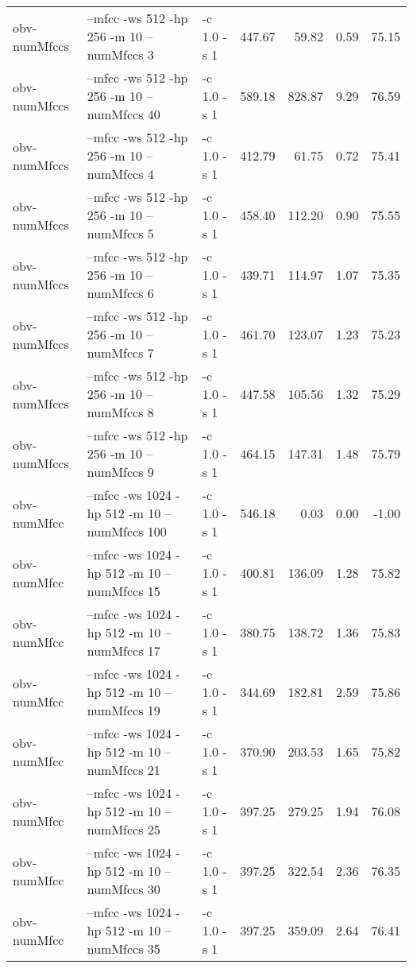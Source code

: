 \documentclass[11pt,a4paper]{article}
\begin{document}
\begin{tabular}{lllrrrr}
 obv-numMfccs  &  --mfcc -ws 512 -hp 256 -m 10 --numMfccs 3      &  -c 1.0 -s 1  &  447.67  &    59.82  &   0.59  &  75.15  \\
 obv-numMfccs  &  --mfcc -ws 512 -hp 256 -m 10 --numMfccs 40     &  -c 1.0 -s 1  &  589.18  &   828.87  &   9.29  &  76.59  \\
 obv-numMfccs  &  --mfcc -ws 512 -hp 256 -m 10 --numMfccs 4      &  -c 1.0 -s 1  &  412.79  &    61.75  &   0.72  &  75.41  \\
 obv-numMfccs  &  --mfcc -ws 512 -hp 256 -m 10 --numMfccs 5      &  -c 1.0 -s 1  &  458.40  &   112.20  &   0.90  &  75.55  \\
 obv-numMfccs  &  --mfcc -ws 512 -hp 256 -m 10 --numMfccs 6      &  -c 1.0 -s 1  &  439.71  &   114.97  &   1.07  &  75.35  \\
 obv-numMfccs  &  --mfcc -ws 512 -hp 256 -m 10 --numMfccs 7      &  -c 1.0 -s 1  &  461.70  &   123.07  &   1.23  &  75.23  \\
 obv-numMfccs  &  --mfcc -ws 512 -hp 256 -m 10 --numMfccs 8      &  -c 1.0 -s 1  &  447.58  &   105.56  &   1.32  &  75.29  \\
 obv-numMfccs  &  --mfcc -ws 512 -hp 256 -m 10 --numMfccs 9      &  -c 1.0 -s 1  &  464.15  &   147.31  &   1.48  &  75.79  \\
 obv-numMfcc   &  --mfcc -ws 1024 -hp 512 -m 10 --numMfccs 100   &  -c 1.0 -s 1  &  546.18  &     0.03  &   0.00  &  -1.00  \\
 obv-numMfcc   &  --mfcc -ws 1024 -hp 512 -m 10 --numMfccs 15    &  -c 1.0 -s 1  &  400.81  &   136.09  &   1.28  &  75.82  \\
 obv-numMfcc   &  --mfcc -ws 1024 -hp 512 -m 10 --numMfccs 17    &  -c 1.0 -s 1  &  380.75  &   138.72  &   1.36  &  75.83  \\
 obv-numMfcc   &  --mfcc -ws 1024 -hp 512 -m 10 --numMfccs 19    &  -c 1.0 -s 1  &  344.69  &   182.81  &   2.59  &  75.86  \\
 obv-numMfcc   &  --mfcc -ws 1024 -hp 512 -m 10 --numMfccs 21    &  -c 1.0 -s 1  &  370.90  &   203.53  &   1.65  &  75.82  \\
 obv-numMfcc   &  --mfcc -ws 1024 -hp 512 -m 10 --numMfccs 25    &  -c 1.0 -s 1  &  397.25  &   279.25  &   1.94  &  76.08  \\
 obv-numMfcc   &  --mfcc -ws 1024 -hp 512 -m 10 --numMfccs 30    &  -c 1.0 -s 1  &  397.25  &   322.54  &   2.36  &  76.35  \\
 obv-numMfcc   &  --mfcc -ws 1024 -hp 512 -m 10 --numMfccs 35    &  -c 1.0 -s 1  &  397.25  &   359.09  &   2.64  &  76.41  \\

\end{tabular}
\end{document}
